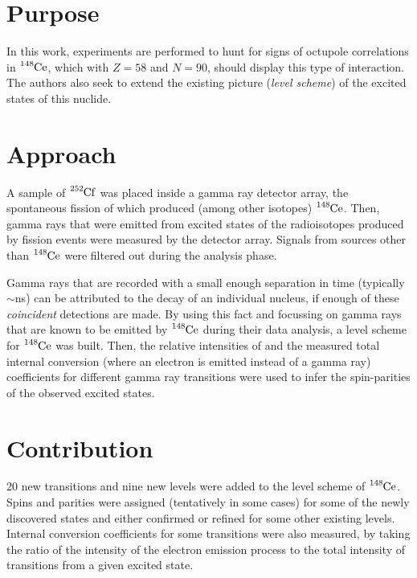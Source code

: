 \documentclass[12pt,a4paper]{article}
\begin{document}
\section*{Purpose}
In this work, experiments are performed to hunt for signs of octupole correlations in $\ce{^{148}Ce}$, which with $Z = 58$ and $N = 90$, should display this type of interaction. The authors also seek to extend the existing picture (\textit{level scheme}) of the excited states of this nuclide.


\section*{Approach}
A sample of $\ce{^{252}Cf}$ was placed inside a gamma ray detector array, the spontaneous fission of which produced (among other isotopes) $\ce{^{148}Ce}$. Then, gamma rays that were emitted from excited states of the radioisotopes produced by fission events were measured by the detector array. Signals from sources other than $\ce{^{148}Ce}$ were filtered out during the analysis phase.

\medskip
Gamma rays that are recorded with a small enough separation in time (typically $\sim$ns) can be attributed to the decay of an individual nucleus, if enough of these \textit{coincident} detections are made. By using this fact and focussing on gamma rays that are known to be emitted by $\ce{^{148}Ce}$ during their data analysis, a level scheme for $\ce{^{148}Ce}$ was built. Then, the relative intensities of and the measured total internal conversion (where an electron is emitted instead of a gamma ray) coefficients for different gamma ray transitions were used to infer the spin-parities of the observed excited states.

\section*{Contribution}
20 new transitions and nine new levels were added to the level scheme of $\ce{^{148}Ce}$. Spins and parities were assigned (tentatively in some cases) for some of the newly discovered states and either confirmed or refined for some other existing levels. Internal conversion coefficients for some transitions were also measured, by taking the ratio of the intensity of the electron emission process to the total intensity of transitions from a given excited state. 
\end{document}
